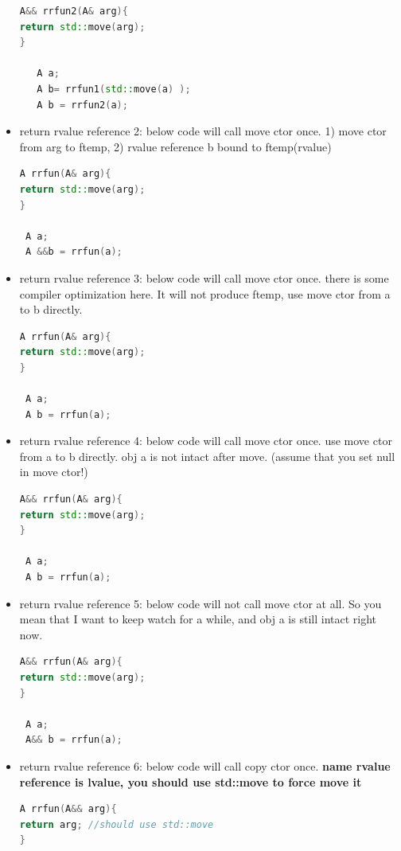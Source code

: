 \documentclass[a4paper,12pt,twoside]{book}
\begin{document}
\begin{itemize}
\begin{lstlisting}[frame=single, language=c++]
A&& rrfun2(A& arg){
return std::move(arg);
}

   A a;
   A b= rrfun1(std::move(a) );
   A b = rrfun2(a);
\end{lstlisting}


\item return rvalue reference 2:   below code will call move ctor once.  1) move ctor from arg to ftemp, 2) rvalue reference b bound to ftemp(rvalue)
\begin{lstlisting}[frame=single, language=c++]
A rrfun(A& arg){
return std::move(arg);
}

 A a;
 A &&b = rrfun(a);
\end{lstlisting}

\item return rvalue reference 3:   below code will call move ctor once.  there is some compiler optimization here. It will not produce ftemp, use move ctor from a to b directly.
\begin{lstlisting}[frame=single, language=c++]
A rrfun(A& arg){
return std::move(arg);
}

 A a;
 A b = rrfun(a);
\end{lstlisting}

\item return rvalue reference 4:   below code will call move ctor once.  use move ctor from a to b directly.  obj a is not intact after move. (assume that you set null in move ctor!)
\begin{lstlisting}[frame=single, language=c++]
A&& rrfun(A& arg){
return std::move(arg);
}

 A a;
 A b = rrfun(a);
\end{lstlisting}

\item return rvalue reference 5:   below code will not call move ctor at all. So you mean that I want to keep watch for a while, and obj a is still intact right now.
\begin{lstlisting}[frame=single, language=c++]
A&& rrfun(A& arg){
return std::move(arg);
}

 A a;
 A&& b = rrfun(a);
\end{lstlisting}

\item return rvalue reference 6:   below code will call copy ctor once. \textbf{name rvalue reference is lvalue, you should use std::move to force move it}
\begin{lstlisting}[frame=single, language=c++]
A rrfun(A&& arg){
return arg; //should use std::move
}


\end{lstlisting}
\end{itemize}
\end{document}
